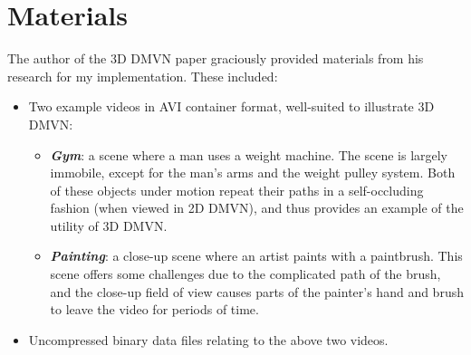\section{Materials}
The author of the 3D DMVN paper graciously provided materials from his research for my implementation. These included:
\begin{itemize}
    \item Two example videos in AVI container format, well-suited to illustrate 3D DMVN:
    \begin{itemize}
    \item \textbf{\emph{Gym}}: a scene where a man uses a weight machine. The scene is largely immobile, except for the man's arms and the weight pulley system. Both of these objects under motion repeat their paths in a self-occluding fashion (when viewed in 2D DMVN), and thus provides an example of the utility of 3D DMVN.
    \item \textbf{\emph{Painting}}: a close-up scene where an artist paints with a paintbrush. This scene offers some challenges due to the complicated path of the brush, and the close-up field of view causes parts of the painter's hand and brush to leave the video for periods of time.
    \end{itemize}
    \item Uncompressed binary data files relating to the above two videos.
\end{itemize}

